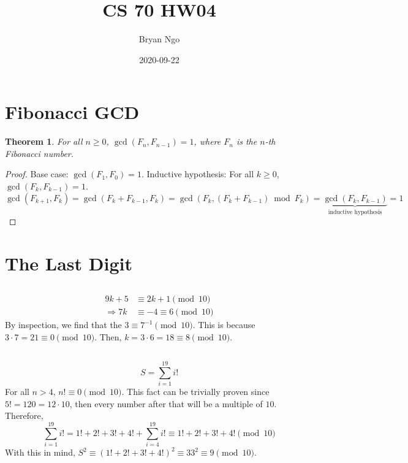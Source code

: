 \documentclass{article}
\title{CS 70 HW04}
\author{Bryan Ngo}
\date{2020-09-22}
\newtheorem{theorem}{Theorem}
\begin{document}
\maketitle

\section{Fibonacci GCD}

\begin{theorem}
    For all \(n \geqslant 0\), \(\gcd(F_n, F_{n - 1}) = 1\), where \(F_n\) is the \(n\)-th Fibonacci number.
\end{theorem}
\begin{proof}
    Base case: \(\gcd(F_1, F_0) = 1\).
    Inductive hypothesis: For all \(k \geqslant 0\), \(\gcd(F_k, F_{k - 1}) = 1\).
    \begin{equation}
        \gcd(F_{k + 1}, F_k) = \gcd(F_k + F_{k - 1}, F_k) = \gcd(F_k, (F_k + F_{k - 1}) \bmod F_k) = \underbrace{\gcd(F_k, F_{k - 1})}_{\text{inductive hypothesis}} = 1
    \end{equation}
\end{proof}

\section{The Last Digit}

\subsection{}

\begin{align}
    9k + 5 &\equiv 2k + 1 \pmod{10} \\
    \Rightarrow 7k &\equiv -4 \equiv 6 \pmod{10}
\end{align}
By inspection, we find that the \(3 \equiv 7^{-1} \pmod{10}\).
This is because \(3 \cdot 7 = 21 \equiv 0 \pmod{10}\).
Then, \(k = 3 \cdot 6 = 18 \equiv 8 \pmod{10}\).

\subsection{}

\begin{equation}
    S = \sum_{i = 1}^{19} i!
\end{equation}
For all \(n > 4\), \(n! \equiv 0 \pmod{10}\).
This fact can be trivially proven since \(5! = 120 = 12 \cdot 10\), then every number after that will be a multiple of \(10\).
Therefore,
\begin{equation}
    \sum_{i = 1}^{19} i! = 1! + 2! + 3! + 4! + \sum_{i = 4}^{19} i! \equiv 1! + 2! + 3! + 4! \pmod{10}
\end{equation}
With this in mind, \(S^2 \equiv (1! + 2! + 3! + 4!)^2 \equiv 33^2 \equiv 9 \pmod{10}\).
\end{document}
